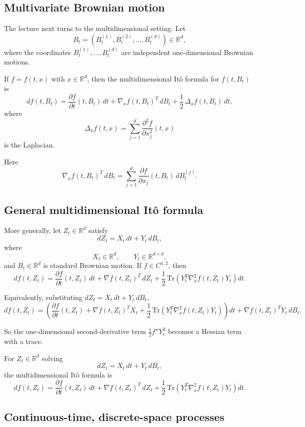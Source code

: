 \documentclass[11pt]{article}
\theoremstyle{definition}
\begin{document}
\subsection{Multivariate Brownian motion}

The lecture next turns to the multidimensional setting.
Let
\[
B_t=(B_t^{(1)},B_t^{(2)},\dots,B_t^{(d)})\in\mathbb R^d,
\]
where the coordinates $B_t^{(1)},\dots,B_t^{(d)}$ are independent one-dimensional Brownian motions.

If $f=f(t,x)$ with $x\in\mathbb R^d$, then the multidimensional It\^o formula for $f(t,B_t)$ is
\[
df(t,B_t)
=
\frac{\partial f}{\partial t}(t,B_t)\,dt
+
\nabla_x f(t,B_t)^T\,dB_t
+
\frac12\,\Delta_x f(t,B_t)\,dt,
\]
where
\[
\Delta_x f(t,x)=\sum_{j=1}^d \frac{\partial^2 f}{\partial x_j^2}(t,x)
\]
is the Laplacian.

Here
\[
\nabla_x f(t,B_t)^T\,dB_t
=
\sum_{j=1}^d \frac{\partial f}{\partial x_j}(t,B_t)\,dB_t^{(j)}.
\]

\subsection{General multidimensional It\^o formula}

More generally, let $Z_t\in\mathbb R^d$ satisfy
\[
dZ_t=X_t\,dt+Y_t\,dB_t,
\]
where
\[
X_t\in\mathbb R^d,
\qquad
Y_t\in\mathbb R^{d\times d},
\]
and $B_t\in\mathbb R^d$ is standard Brownian motion.
If $f\in C^{1,2}$, then
\[
df(t,Z_t)
=
\frac{\partial f}{\partial t}(t,Z_t)\,dt
+
\nabla f(t,Z_t)^T\,dZ_t
+
\frac12\,\mathrm{Tr}\!\left(Y_t^T\nabla_x^2 f(t,Z_t)Y_t\right)dt.
\]

Equivalently, substituting $dZ_t=X_t\,dt+Y_t\,dB_t$,
\[
df(t,Z_t)
=
\left(
\frac{\partial f}{\partial t}(t,Z_t)
+
\nabla f(t,Z_t)^T X_t
+
\frac12\,\mathrm{Tr}\!\left(Y_t^T\nabla_x^2 f(t,Z_t)Y_t\right)
\right)dt
+
\nabla f(t,Z_t)^T Y_t\,dB_t.
\]

So the one-dimensional second-derivative term $\frac12 f''Y_t^2$ becomes a Hessian term with a trace.

\begin{keyformula}
For $Z_t\in\mathbb R^d$ solving
\[
dZ_t=X_t\,dt+Y_t\,dB_t,
\]
the multidimensional It\^o formula is
\[
df(t,Z_t)
=
\frac{\partial f}{\partial t}(t,Z_t)\,dt
+
\nabla f(t,Z_t)^T\,dZ_t
+
\frac12\,\mathrm{Tr}\!\left(Y_t^T\nabla_x^2 f(t,Z_t)Y_t\right)dt.
\]
\end{keyformula}

\subsection{Continuous-time, discrete-space processes}
\end{document}

